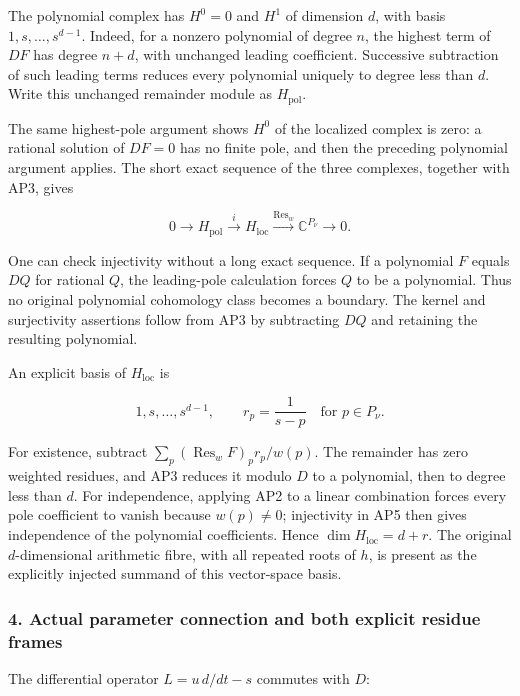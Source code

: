The polynomial complex has \(H^0=0\) and \(H^1\) of dimension \(d\), with basis \(1,s,\ldots,s^{d-1}\). Indeed, for a nonzero polynomial of degree \(n\), the highest term of \(DF\) has degree \(n+d\), with unchanged leading coefficient. Successive subtraction of such leading terms reduces every polynomial uniquely to degree less than \(d\). Write this unchanged remainder module as \(H_{\mathrm{pol}}\).

The same highest-pole argument shows \(H^0\) of the localized complex is zero: a rational solution of \(DF=0\) has no finite pole, and then the preceding polynomial argument applies. The short exact sequence of the three complexes, together with AP3, gives

\[
0\longrightarrow H_{\mathrm{pol}}\xrightarrow{i}H_{\mathrm{loc}}
\xrightarrow{\operatorname{Res}_w}\mathbb C^{P_\nu}\longrightarrow0.
\tag{AP5}
\]

One can check injectivity without a long exact sequence. If a polynomial \(F\) equals \(DQ\) for rational \(Q\), the leading-pole calculation forces \(Q\) to be a polynomial. Thus no original polynomial cohomology class becomes a boundary. The kernel and surjectivity assertions follow from AP3 by subtracting \(DQ\) and retaining the resulting polynomial.

An explicit basis of \(H_{\mathrm{loc}}\) is

\[
1,s,\ldots,s^{d-1},\qquad r_p=\frac{1}{s-p}
\quad\text{for }p\in P_\nu.
\tag{AP6}
\]

For existence, subtract \(\sum_p (\operatorname{Res}_w F)_p r_p/w(p)\). The remainder has zero weighted residues, and AP3 reduces it modulo \(D\) to a polynomial, then to degree less than \(d\). For independence, applying AP2 to a linear combination forces every pole coefficient to vanish because \(w(p)\ne0\); injectivity in AP5 then gives independence of the polynomial coefficients. Hence \(\dim H_{\mathrm{loc}}=d+r\). The original \(d\)-dimensional arithmetic fibre, with all repeated roots of \(h\), is present as the explicitly injected summand of this vector-space basis.

\subsubsection{4. Actual parameter connection and both explicit residue frames}\label{endpoint-analytic_pole--actual-parameter-connection-and-both-explicit-residue-frames}

The differential operator \(L=u\,d/dt-s\) commutes with \(D\):

